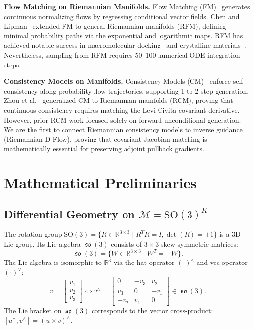 \documentclass[10pt,twocolumn,letterpaper]{article}
\DeclareMathOperator{\so}{\mathfrak{so}}
\begin{document}
\textbf{Flow Matching on Riemannian Manifolds.}
Flow Matching (FM)~\cite{lipman2023flow} generates continuous normalizing flows by regressing conditional vector fields. Chen and Lipman~\cite{chen2023riemannian} extended FM to general Riemannian manifolds (RFM), defining minimal probability paths via the exponential and logarithmic maps. RFM has achieved notable success in macromolecular docking~\cite{yim2023fast,bose2023se3} and crystalline materials~\cite{miller2024flowmm}. Nevertheless, sampling from RFM requires 50--100 numerical ODE integration steps.

\textbf{Consistency Models on Manifolds.}
Consistency Models (CM)~\cite{song2023consistency,song2023improved} enforce self-consistency along probability flow trajectories, supporting 1-to-2 step generation. Zhou et al.~\cite{zhou2025rcm} generalized CM to Riemannian manifolds (RCM), proving that continuous consistency requires matching the Levi-Civita covariant derivative. However, prior RCM work focused solely on forward unconditional generation. We are the first to connect Riemannian consistency models to inverse guidance (Riemannian D-Flow), proving that covariant Jacobian matching is mathematically essential for preserving adjoint pullback gradients.

\section{Mathematical Preliminaries}

\subsection{Differential Geometry on $\mathcal{M} = \mathrm{SO}(3)^K$}
The rotation group $\mathrm{SO}(3) = \{ R \in \mathbb{R}^{3 \times 3} \mid R^T R = I, \det(R) = +1 \}$ is a 3D Lie group. Its Lie algebra $\so(3)$ consists of $3 \times 3$ skew-symmetric matrices:
\begin{equation}
\so(3) = \{ W \in \mathbb{R}^{3 \times 3} \mid W^T = -W \}.
\end{equation}
The Lie algebra is isomorphic to $\mathbb{R}^3$ via the hat operator $(\cdot)^\wedge$ and vee operator $(\cdot)^\vee$:
\begin{equation}
v = \begin{bmatrix} v_1 \\ v_2 \\ v_3 \end{bmatrix} \iff v^\wedge = \begin{bmatrix} 0 & -v_3 & v_2 \\ v_3 & 0 & -v_1 \\ -v_2 & v_1 & 0 \end{bmatrix} \in \so(3).
\end{equation}
The Lie bracket on $\so(3)$ corresponds to the vector cross-product: $[u^\wedge, v^\wedge] = (u \times v)^\wedge$.
\end{document}
